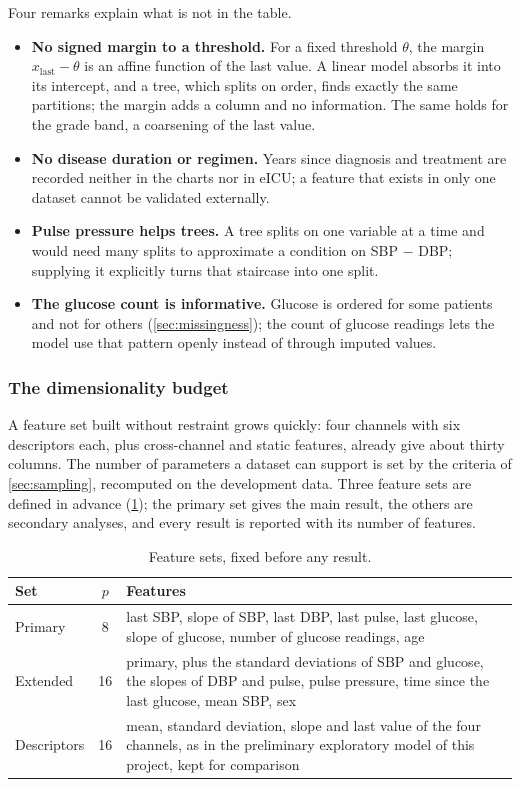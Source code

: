 Four remarks explain what is not in the table.
\begin{itemize}[nosep]
  \item \textbf{No signed margin to a threshold.} For a fixed threshold $\theta$, the margin $x_{\text{last}} - \theta$ is an affine function of the last value. A linear model absorbs it into its intercept, and a tree, which splits on order, finds exactly the same partitions; the margin adds a column and no information. The same holds for the grade band, a coarsening of the last value.
  \item \textbf{No disease duration or regimen.} Years since diagnosis and treatment are recorded neither in the charts nor in eICU; a feature that exists in only one dataset cannot be validated externally.
  \item \textbf{Pulse pressure helps trees.} A tree splits on one variable at a time and would need many splits to approximate a condition on SBP $-$ DBP; supplying it explicitly turns that staircase into one split.
  \item \textbf{The glucose count is informative.} Glucose is ordered for some patients and not for others (\cref{sec:missingness}); the count of glucose readings lets the model use that pattern openly instead of through imputed values.
\end{itemize}

\subsubsection{The dimensionality budget}\label{sec:budget}\label{sec:np}\label{sec:candidate-sets}

A feature set built without restraint grows quickly: four channels with six descriptors each, plus cross-channel and static features, already give about thirty columns. The number of parameters a dataset can support is set by the criteria of \cref{sec:sampling}, recomputed on the development data. Three feature sets are defined in advance (\cref{tab:feature-sets}); the primary set gives the main result, the others are secondary analyses, and every result is reported with its number of features.

\begin{table}[htbp]
\centering\footnotesize
\caption{Feature sets, fixed before any result.}\label{tab:feature-sets}
\begin{tabularx}{\textwidth}{@{}>{\raggedright\arraybackslash}p{2.4cm} c X@{}}
\toprule
\textbf{Set} & \textbf{$p$} & \textbf{Features} \\
\midrule
Primary & 8 & last SBP, slope of SBP, last DBP, last pulse, last glucose, slope of glucose, number of glucose readings, age \\
Extended & 16 & primary, plus the standard deviations of SBP and glucose, the slopes of DBP and pulse, pulse pressure, time since the last glucose, mean SBP, sex \\
Descriptors & 16 & mean, standard deviation, slope and last value of the four channels, as in the preliminary exploratory model of this project, kept for comparison \\
\bottomrule
\end{tabularx}
\end{table}

